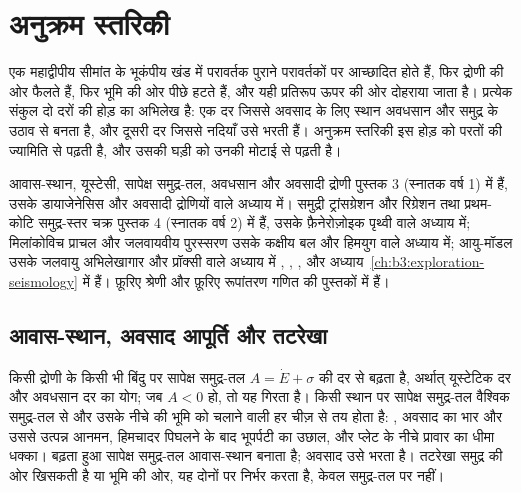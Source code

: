 \chapter{अनुक्रम स्तरिकी}\label{ch:b3:sequence-stratigraphy}

एक महाद्वीपीय सीमांत के भूकंपीय खंड में परावर्तक पुराने परावर्तकों पर आच्छादित होते हैं,
फिर द्रोणी की ओर फैलते हैं, फिर भूमि की ओर पीछे हटते हैं,
और यही प्रतिरूप ऊपर की ओर दोहराया जाता है। प्रत्येक संकुल दो दरों की होड़ का अभिलेख है:
एक दर जिससे अवसाद के लिए स्थान अवधसान और समुद्र के उठाव से बनता है,
और दूसरी दर जिससे नदियाँ उसे भरती हैं। अनुक्रम स्तरिकी इस होड़ को परतों की ज्यामिति से पढ़ती है,
और 
उसकी घड़ी को उनकी मोटाई से पढ़ती है।

\begin{recall}
आवास-स्थान, यूस्टेसी, सापेक्ष समुद्र-तल, अवधसान और अवसादी द्रोणी
पुस्तक 3 (स्नातक वर्ष 1) में हैं, उसके डायाजेनेसिस और अवसादी द्रोणियों वाले अध्याय में।
समुद्री ट्रांसग्रेशन और रिग्रेशन तथा प्रथम-कोटि समुद्र-स्तर चक्र
पुस्तक 4 (स्नातक वर्ष 2) में हैं, उसके फ़ैनेरोज़ोइक पृथ्वी वाले अध्याय में;
मिलांकोविच प्राचल और जलवायवीय पुरस्सरण उसके कक्षीय बल और हिमयुग वाले अध्याय में;
आयु-मॉडल उसके जलवायु अभिलेखागार और प्रॉक्सी वाले अध्याय में
, , ,  और 
अध्याय~\ref{ch:b3:exploration-seismology} में हैं।
फ़ूरिए श्रेणी और फ़ूरिए रूपांतरण गणित की पुस्तकों में हैं।
\end{recall}

\section{आवास-स्थान, अवसाद आपूर्ति और तटरेखा}\label{sec:b3:sequence-stratigraphy:shoreline}

किसी द्रोणी के किसी भी बिंदु पर सापेक्ष समुद्र-तल $A = \dot E
+ \sigma$ की दर से बढ़ता है, अर्थात् यूस्टेटिक दर और अवधसान दर का योग; जब $A < 0$ हो, तो यह गिरता है।
किसी स्थान पर सापेक्ष समुद्र-तल वैश्विक समुद्र-तल से और उसके नीचे की भूमि को
चलाने वाली हर चीज़ से तय होता है: , अवसाद का भार और
उससे उत्पन्न आनमन, हिमचादर पिघलने के बाद भूपर्पटी का उछाल,
और प्लेट के नीचे प्रावार का धीमा धक्का।
बढ़ता हुआ सापेक्ष समुद्र-तल आवास-स्थान बनाता है;
अवसाद उसे भरता है। तटरेखा समुद्र की ओर खिसकती है या भूमि की ओर,
यह दोनों पर निर्भर करता है, केवल समुद्र-तल पर नहीं।

